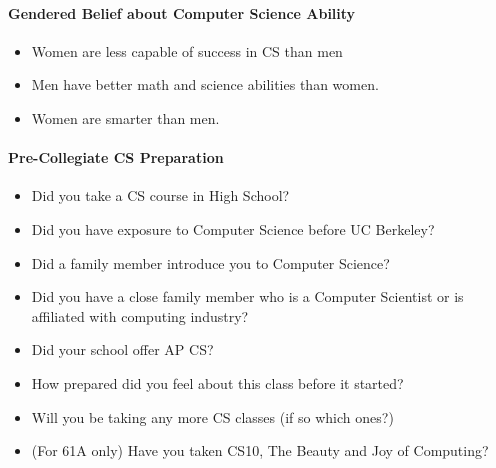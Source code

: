 \paragraph *{Gendered Belief about Computer Science Ability}\mbox{}
\begin{itemize}
\item Women are less capable of success in CS than men
\item Men have better math and science abilities than women.
\item Women are smarter than men.
\end{itemize}

\paragraph *{Pre-Collegiate CS Preparation}\mbox{}
\begin{itemize}
\item Did you take a CS course in High School?
\item Did you have exposure to Computer Science before UC Berkeley?
\item Did a family member introduce you to Computer Science?
\item Did you have a close family member who is a Computer Scientist or is affiliated with computing industry?
\item Did your school offer AP CS?
\item How prepared did you feel about this class before it started?
\item Will you be taking any more CS classes (if so which ones?)
\item (For 61A only) Have you taken CS10, The Beauty and Joy of Computing?
\end{itemize}